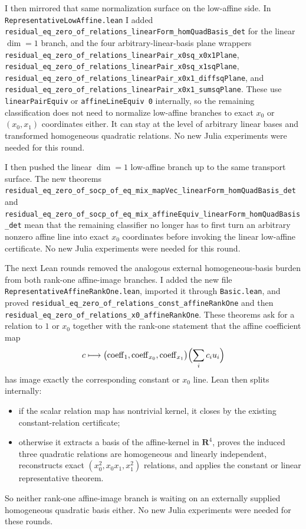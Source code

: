 \documentclass[11pt]{article}
\begin{document}
I then mirrored that same normalization surface on the low-affine side. In
\texttt{RepresentativeLowAffine.lean} I added
\texttt{residual\_eq\_zero\_of\_relations\_linearForm\_homQuadBasis\_det} for
the linear \(\dim=1\) branch, and the four arbitrary-linear-basis plane
wrappers
\texttt{residual\_eq\_zero\_of\_relations\_linearPair\_x0sq\_x0x1Plane},
\texttt{residual\_eq\_zero\_of\_relations\_linearPair\_x0sq\_x1sqPlane},
\texttt{residual\_eq\_zero\_of\_relations\_linearPair\_x0x1\_diffsqPlane}, and
\texttt{residual\_eq\_zero\_of\_relations\_linearPair\_x0x1\_sumsqPlane}. These
use \texttt{linearPairEquiv} or \texttt{affineLineEquiv 0} internally, so the
remaining classification does not need to normalize low-affine branches to
exact \(x_0\) or \((x_0,x_1)\) coordinates either. It can stay at the level of
arbitrary linear bases and transformed homogeneous quadratic relations. No new
Julia experiments were needed for this round.

I then pushed the linear \(\dim=1\) low-affine branch up to the same transport
surface. The new theorems
\texttt{residual\_eq\_zero\_of\_socp\_of\_eq\_mix\_mapVec\_linearForm\_homQuadBasis\_det}
and
\texttt{residual\_eq\_zero\_of\_socp\_of\_eq\_mix\_affineEquiv\_linearForm\_homQuadBasis\_det}
mean that the remaining classifier no longer has to first turn an arbitrary
nonzero affine line into exact \(x_0\) coordinates before invoking the linear
low-affine certificate. No new Julia experiments were needed for this round.

The next Lean rounds removed the analogous external homogeneous-basis burden
from both rank-one affine-image branches. I added the new file
\texttt{RepresentativeAffineRankOne.lean}, imported it through
\texttt{Basic.lean}, and proved
\texttt{residual\_eq\_zero\_of\_relations\_const\_affineRankOne} and then
\texttt{residual\_eq\_zero\_of\_relations\_x0\_affineRankOne}. These theorems
ask for a relation to \(1\) or \(x_0\) together with the rank-one statement
that the affine coefficient map
\[
  c \longmapsto
  \bigl(\operatorname{coeff}_1,\operatorname{coeff}_{x_0},
    \operatorname{coeff}_{x_1}\bigr)\Bigl(\sum_i c_i u_i\Bigr)
\]
has image exactly the corresponding constant or \(x_0\) line. Lean then splits
internally:
\begin{itemize}
\item if the scalar relation map has nontrivial kernel, it closes by the
existing constant-relation certificate;
\item otherwise it extracts a basis of the affine-kernel in \(\mathbf{R}^4\),
proves the induced three quadratic relations are homogeneous and linearly
independent, reconstructs exact \((x_0^2,x_0x_1,x_1^2)\) relations, and
applies the constant or linear representative theorem.
\end{itemize}
So neither rank-one affine-image branch is waiting on an externally supplied
homogeneous quadratic basis either. No new Julia experiments were needed for
these rounds.
\end{document}
